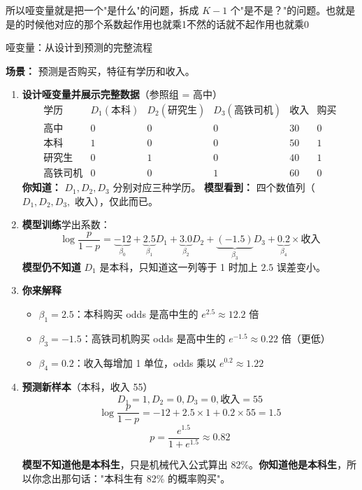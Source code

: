 \begin{dxtips}
所以哑变量就是把一个"是什么"的问题，拆成 $K-1$ 个"是不是？"的问题。也就是是的时候他对应的那个系数起作用也就乘1不然的话就不起作用也就乘0
\end{dxtips}
\begin{example}{哑变量：从设计到预测的完整流程}

\textbf{场景：} 预测是否购买，特征有学历和收入。

\begin{enumerate}
    \item \textbf{设计哑变量并展示完整数据}（参照组 = 高中）
    \[
    \begin{array}{c|cccc|c}
    \text{学历} & D_1(\text{本科}) & D_2(\text{研究生}) & D_3(\text{高铁司机}) & \text{收入} & \text{购买}\\ \hline
    \text{高中} & 0 & 0 & 0 & 30 & 0\\
    \text{本科} & 1 & 0 & 0 & 50 & 1\\
    \text{研究生} & 0 & 1 & 0 & 40 & 1\\
    \text{高铁司机} & 0 & 0 & 1 & 60 & 0
    \end{array}
    \]
    \textbf{你知道：} $D_1,D_2,D_3$ 分别对应三种学历。
    \textbf{模型看到：} 四个数值列（$D_1,D_2,D_3,$ 收入），仅此而已。

    \item \textbf{模型训练}学出系数：
    \[
    \log\frac{p}{1-p} = \underbrace{-12}_{\beta_0} + \underbrace{2.5}_{\beta_1}D_1 + \underbrace{3.0}_{\beta_2}D_2 + \underbrace{(-1.5)}_{\beta_3}D_3 + \underbrace{0.2}_{\beta_4}\times\text{收入}
    \]
    \textbf{模型仍不知道} $D_1$ 是本科，只知道这一列等于 1 时加上 $2.5$ 误差变小。

    \item \textbf{你来解释}
    \begin{itemize}
        \item $\beta_1=2.5$：本科购买 odds 是高中生的 $e^{2.5}\approx 12.2$ 倍
        \item $\beta_3=-1.5$：高铁司机购买 odds 是高中生的 $e^{-1.5}\approx 0.22$ 倍（更低）
        \item $\beta_4=0.2$：收入每增加 1 单位，odds 乘以 $e^{0.2}\approx 1.22$
    \end{itemize}

    \item \textbf{预测新样本}（本科，收入 55）
    \[
    D_1=1,D_2=0,D_3=0,\text{收入}=55
    \]
    \[
    \log\frac{p}{1-p} = -12 + 2.5\times 1 + 0.2\times 55 = 1.5
    \]
    \[
    p = \frac{e^{1.5}}{1+e^{1.5}} \approx 0.82
    \]

    \textbf{模型不知道他是本科生}，只是机械代入公式算出 82\%。\textbf{你知道他是本科生}，所以你念出那句话："本科生有 82\% 的概率购买"。
\end{enumerate}

\end{example}

